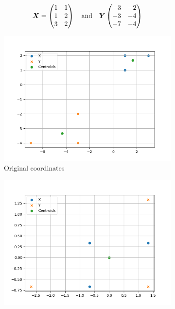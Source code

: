 \documentclass[12pt]{report}
\begin{document}
\begin{equation*}
    {\boldsymbol{{X}}} = 
    \begin{pmatrix} 
        1 & 1 \\
        1 & 2 \\
        3 & 2
    \end{pmatrix}
    \quad 
    \text{and} 
    \quad 
    {\boldsymbol{{Y}}}
    \begin{pmatrix} 
        -3 & -2 \\
        -3 & -4 \\
        -7 & -4
    \end{pmatrix}
\end{equation*}

\begin{figure}[h]
    \centering
    \begin{subfigure}[b]{0.475\textwidth}
        \centering
        \includegraphics[width=\textwidth]{figures/procrustes_ex1}
        \caption[]
        {{\small Original coordinates}}    
        \label{fig:procrustes_ex_1}
    \end{subfigure}
    \begin{subfigure}[b]{0.475\textwidth}  
        \centering 
        \includegraphics[width=\textwidth]{figures/procrustes_ex2}

\end{subfigure}
\end{figure}
\end{document}
